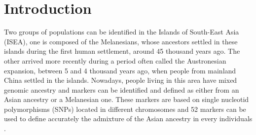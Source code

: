 \documentclass[a4paper,12pt]{report}
\begin{document}

\begin{spacing}{1.2}
 \tableofcontents
\end{spacing}

\chapter*{Introduction}
Two groups of populations can be identified in the Islands of South-East Asia (ISEA), one is composed of the Melanesians, whose ancestors settled in these islands during the first human settlement, around 45 thousand years ago. The other arrived more recently during a period often called the Austronesian expansion, between 5 and 4 thousand years ago, when people from mainland China settled in the islands. Nowadays, people living in this area have mixed genomic ancestry and markers can be identified and defined as either from an Asian ancestry or a Melanesian one. These markers are based on single nucleotid polymorphisms (SNPs) located in different chromosomes and 52 markers can be used to define accurately the admixture of the Asian ancestry in every individuals \cite{Cox01}.
\end{document}
